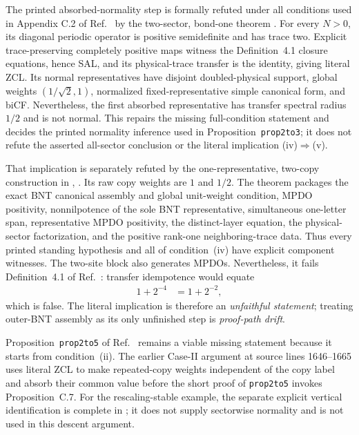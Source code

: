 \documentclass{article}
\begin{document}
The printed absorbed-normality step is formally refuted under all conditions
used in Appendix C.2 of Ref.~\cite{Cirac2016MPDO_arXiv} by the two-sector,
bond-one theorem
.
For every $N>0$, its diagonal periodic operator is positive semidefinite and
has trace two. Explicit trace-preserving completely positive maps witness the
Definition~4.1 closure equations, hence SAL, and its physical-trace transfer
is the identity, giving literal ZCL. Its normal representatives have disjoint
doubled-physical support, global weights $(1/\sqrt2,1)$, normalized
fixed-representative simple canonical form, and biCF. Nevertheless, the first
absorbed representative has transfer spectral radius $1/2$ and is not normal.
This repairs the missing full-condition statement and decides the printed
normality inference used in Proposition~\texttt{prop2to3}; it does not refute
the asserted all-sector conclusion or the literal implication
(iv)$\Rightarrow$(v).

That implication is separately refuted by the one-representative, two-copy
construction in
,
. Its raw copy weights are $1$ and $1/2$.
The theorem packages the exact BNT canonical assembly and global unit-weight
condition, MPDO positivity, nonnilpotence of the sole BNT representative,
simultaneous one-letter span, representative MPDO positivity, the
distinct-layer equation, the physical-sector factorization, and the positive
rank-one neighboring-trace data. Thus every printed standing hypothesis and
all of condition~(iv) have explicit component witnesses. The two-site block
also generates MPDOs. Nevertheless, it fails Definition~4.1 of
Ref.~\cite{Cirac2016MPDO_arXiv}: transfer idempotence would equate
\begin{align}
    1+2^{-4}
        &= 1+2^{-2},
    \label{eq:cpgsv17_repeated_copy_false_trace_equality}
\end{align}
which is false. The literal implication is therefore an \emph{unfaithful
statement}; treating outer-BNT assembly as its only unfinished step is
\emph{proof-path drift}.

Proposition~\texttt{prop2to5} of Ref.~\cite{Cirac2016MPDO_arXiv} remains a
viable missing statement because it starts from condition~(ii). The earlier
Case-II argument at source lines 1646--1665 uses literal ZCL to make
repeated-copy weights independent of the copy label and absorb their common
value before the short proof of \texttt{prop2to5} invokes Proposition~C.7. For
the rescaling-stable example, the separate explicit vertical identification
is complete in
;
it does not supply sectorwise normality and is not used in this descent
argument.
\end{document}
